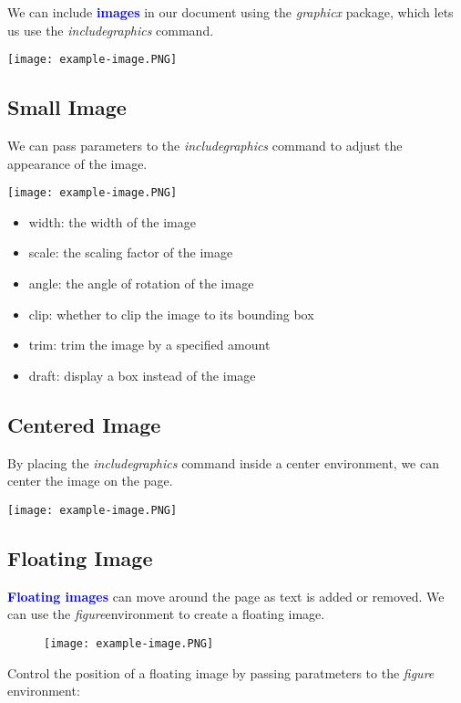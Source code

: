 \documentclass{article}
\newcommand{\kw}[1]{\textcolor{blue}{\textbf{#1}}}
\newcommand{\cmd}[1]{\textit{#1}}
\begin{document}
We can include \kw{images} in our document using the \cmd{graphicx} package, which lets us use the
\cmd{includegraphics} command.

\texttt{[image: example-image.PNG]}

\subsection{Small Image}

We can pass parameters to the \cmd{includegraphics} command to adjust the appearance of the image.

\texttt{[image: example-image.PNG]}

\begin{itemize}
  \item width: the width of the image
  \item scale: the scaling factor of the image
  \item angle: the angle of rotation of the image
  \item clip: whether to clip the image to its bounding box
  \item trim: trim the image by a specified amount
  \item draft: display a box instead of the image
\end{itemize}

\subsection{Centered Image}

By placing the \cmd{includegraphics} command inside a center environment, we can center the
image on the page.

\begin{center}
  \texttt{[image: example-image.PNG]}
\end{center}

\subsection{Floating Image}

\kw{Floating images} can move around the page as text is added or removed. We can use the
\cmd{figure}environment to create a floating image.

\begin{figure}[ht]
  \centering
  \texttt{[image: example-image.PNG]}
\end{figure}

Control the position of a floating image by passing paratmeters to the \cmd{figure} environment:
\end{document}
